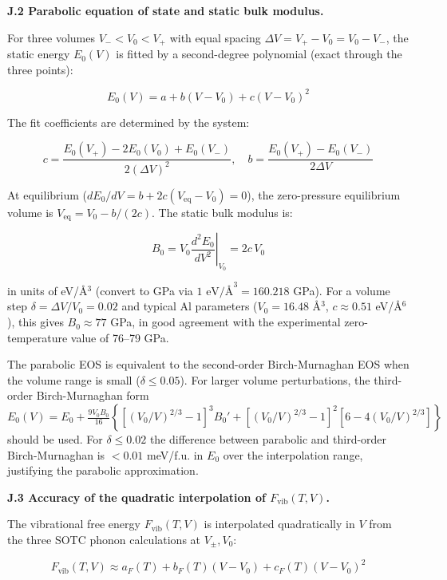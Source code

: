 \documentclass[aps,prb,reprint,amsmath,amssymb,floatfix]{revtex4-2}
\begin{document}
\textbf{J.2 Parabolic equation of state and static bulk modulus.}

For three volumes \(V_- < V_0 < V_+\) with equal spacing
\(\Delta V = V_+ - V_0 = V_0 - V_-\), the static energy \(E_0(V)\) is
fitted by a second-degree polynomial (exact through the three points):

\begin{equation*}
E_0(V) = a + b(V-V_0) + c(V-V_0)^2
\end{equation*}

The fit coefficients are determined by the system:

\begin{equation*}
c = \frac{E_0(V_+) - 2E_0(V_0) + E_0(V_-)}{2(\Delta V)^2}, \quad b = \frac{E_0(V_+) - E_0(V_-)}{2\Delta V}
\end{equation*}

At equilibrium (\(dE_0/dV = b + 2c(V_\text{eq}-V_0) = 0\)), the
zero-pressure equilibrium volume is \(V_\text{eq} = V_0 - b/(2c)\). The
static bulk modulus is:

\begin{equation*}
B_0 = V_0\left.\frac{d^2E_0}{dV^2}\right|_{V_0} = 2c\,V_0
\end{equation*}

in units of eV/Å\(^3\) (convert to GPa via \(1\text{ eV/Å}^3 = 160.218\)
GPa). For a volume step \(\delta = \Delta V/V_0 = 0.02\) and typical Al
parameters (\(V_0 = 16.48\) Å\(^3\), \(c \approx 0.51\) eV/Å\(^6\)),
this gives \(B_0 \approx 77\) GPa, in good agreement with the
experimental zero-temperature value of 76--79 GPa.

The parabolic EOS is equivalent to the second-order Birch-Murnaghan EOS
when the volume range is small (\(\delta \leq 0.05\)). For larger volume
perturbations, the third-order Birch-Murnaghan form
\(E_0(V) = E_0 + \frac{9V_0B_0}{16}\left\{\left[(V_0/V)^{2/3}-1\right]^3 B_0' + \left[(V_0/V)^{2/3}-1\right]^2\left[6-4(V_0/V)^{2/3}\right]\right\}\)
should be used. For \(\delta \leq 0.02\) the difference between
parabolic and third-order Birch-Murnaghan is \(< 0.01\) meV/f.u. in
\(E_0\) over the interpolation range, justifying the parabolic
approximation.

\textbf{J.3 Accuracy of the quadratic interpolation of
\(F_\text{vib}(T,V)\).}

The vibrational free energy \(F_\text{vib}(T,V)\) is interpolated
quadratically in \(V\) from the three SOTC phonon calculations at
\(V_\pm, V_0\):

\begin{equation*}
F_\text{vib}(T,V) \approx a_F(T) + b_F(T)(V-V_0) + c_F(T)(V-V_0)^2
\end{equation*}
\end{document}
